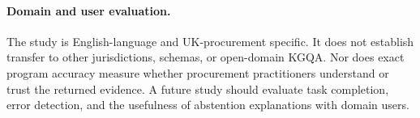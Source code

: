 \paragraph{Domain and user evaluation.}
The study is English-language and UK-procurement specific.  It does not establish transfer to
other jurisdictions, schemas, or open-domain KGQA.  Nor does exact program accuracy measure
whether procurement practitioners understand or trust the returned evidence.  A future study
should evaluate task completion, error detection, and the usefulness of abstention explanations
with domain users.
